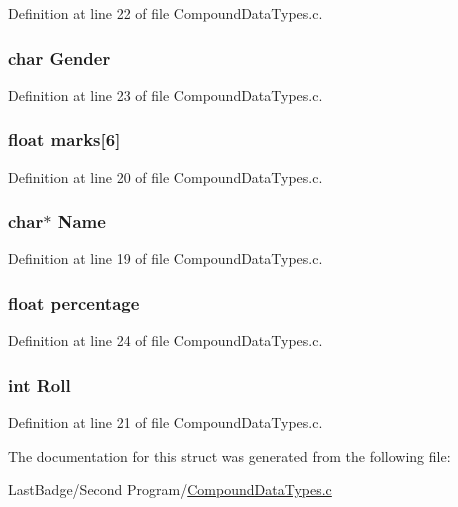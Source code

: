 Definition at line 22 of file Compound\+Data\+Types.\+c.

\hypertarget{structmember_afbcfc79081bb5d32e3e787e11b880fda}{
\subsubsection[{Gender}]{\setlength{\rightskip}{0pt plus 5cm}char Gender}}\label{structmember_afbcfc79081bb5d32e3e787e11b880fda}


Definition at line 23 of file Compound\+Data\+Types.\+c.

\hypertarget{structmember_ad4c3e5c25307fd49af034db07064803a}{
\subsubsection[{marks}]{\setlength{\rightskip}{0pt plus 5cm}float marks\mbox{[}6\mbox{]}}}\label{structmember_ad4c3e5c25307fd49af034db07064803a}


Definition at line 20 of file Compound\+Data\+Types.\+c.

\hypertarget{structmember_a5e6182c030324511dd82e9fa1a0ab071}{
\subsubsection[{Name}]{\setlength{\rightskip}{0pt plus 5cm}char$\ast$ Name}}\label{structmember_a5e6182c030324511dd82e9fa1a0ab071}


Definition at line 19 of file Compound\+Data\+Types.\+c.

\hypertarget{structmember_a34c5b668208550b3c34a2ed0eec615f5}{
\subsubsection[{percentage}]{\setlength{\rightskip}{0pt plus 5cm}float percentage}}\label{structmember_a34c5b668208550b3c34a2ed0eec615f5}


Definition at line 24 of file Compound\+Data\+Types.\+c.

\hypertarget{structmember_abf08303c7c1c86949317530985b66f65}{
\subsubsection[{Roll}]{\setlength{\rightskip}{0pt plus 5cm}int Roll}}\label{structmember_abf08303c7c1c86949317530985b66f65}


Definition at line 21 of file Compound\+Data\+Types.\+c.



The documentation for this struct was generated from the following file\+:\begin{DoxyCompactItemize}
\item 
Last\+Badge/\+Second Program/\hyperlink{_compound_data_types_8c}{Compound\+Data\+Types.\+c}\end{DoxyCompactItemize}
